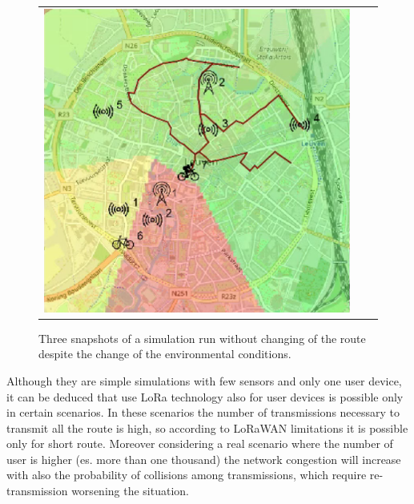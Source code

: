 \begin{figure}[h]
\begin{tabular}{lll}
         \includegraphics[scale=0.42]{figures/sim2snap3.png} 
    \end{tabular}
    \caption[Snapshots of a simulation run of the second scenario (case study 1)]{Three snapshots of a simulation run without changing of the route despite the change of the environmental conditions.}
    \label{fig:sim2}
\end{figure}
% 

Although they are simple simulations with few sensors and only one user device, it can be deduced that use LoRa technology also for user devices is possible only in certain scenarios.
In these scenarios the number of transmissions necessary to transmit all the route is high, so according to LoRaWAN limitations it is possible only for short route.
Moreover considering a real scenario where the number of user is higher (es. more than one thousand) the network congestion will increase with also the probability of collisions among transmissions, which require re-transmission worsening the situation.
